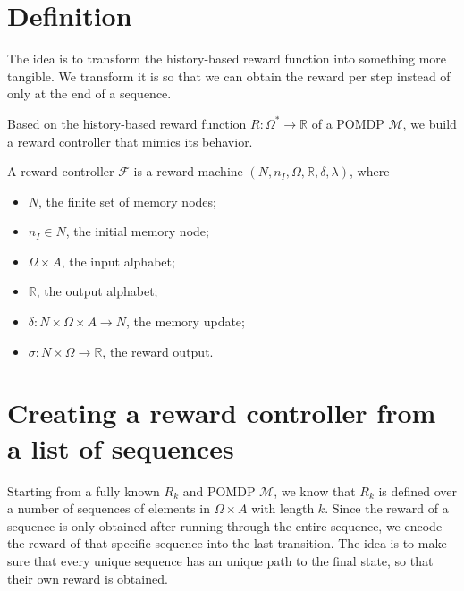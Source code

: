 \section{Definition}


The idea is to transform the history-based reward function into something more tangible. We transform it is so that we can obtain the reward per step instead of only at the end of a sequence.


Based on the history-based reward function $R:\Omega^*\to\mathbb{R}$ of a POMDP $\mathcal{M}$, we build a reward controller that mimics its behavior.



\begin{definition}
	A reward controller $\mathcal{F}$ is a reward machine $(N,n_I, \Omega, \mathbb{R}, \delta, \lambda)$, where
	\begin{itemize}
		\item $N$, the finite set of memory nodes;
		\item $n_I\in N$, the initial memory node;
		\item $\Omega\times A$, the input alphabet;
		\item $\mathbb{R}$, the output alphabet;
		\item $\delta: N \times \Omega \times A \to N$, the memory update;
		\item $\sigma: N \times \Omega \to \mathbb{R}$, the reward output. 
	\end{itemize}
\end{definition}


\section{Creating a reward controller from a list of sequences}
Starting from a fully known $R_k$ and POMDP $\mathcal{M}$, we know that $R_k$ is defined over a number of sequences of elements in $\Omega\times A$ with length $k$. Since the reward of a sequence is only obtained after running through the entire sequence, we encode the reward of that specific sequence into the last transition. The idea is to make sure that every unique sequence has an unique path to the final state, so that their own reward is obtained.

